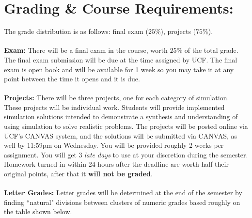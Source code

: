 \documentclass[paper=letter, fontsize=12pt]{article}
\begin{document}
\section{Grading \& Course Requirements:}
The grade distribution is as follows: final exam ($25\%$), projects ($75\%$).
\\\\
\noindent \textcolor{myRed}{\textbf{Exam:}} There will be a final exam in the course, worth $25\%$ of the total grade. The final exam submission will be due at the time assigned by UCF.  The final exam is open book and will be available for 1 week so you may take it at any point between the time it opens and it is due. \\\\
\textcolor{myRed}{\textbf{Projects:}} There will be three projects, one for each category of simulation. These projects will be individual work. Students will provide implemented simulation solutions intended to demonstrate a synthesis and understanding of using simulation to solve realistic problems. The projects will be posted online via UCF’s CANVAS system, and the solutions will be submitted
via CANVAS, as well by 11:59pm on Wednesday. You will be provided roughly 2 weeks per assignment. You will get 3 \textit{late days} to use at your discretion during the semester. Homework turned in within 24 hours after the deadline are worth half their original points, after that it \textbf{will not be graded}.
\\\\
\textcolor{myRed}{\textbf{Letter Grades:}}
Letter grades will  be determined at the end of the semester by finding ``natural" divisions between clusters of numeric grades based roughly on the table shown below. 
\end{document}
